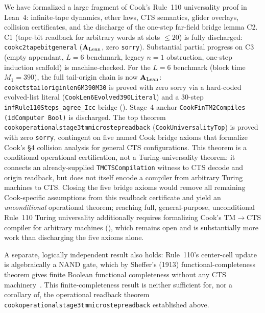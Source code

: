 \documentclass[11pt]{article}
\theoremstyle{remark}
\newcommand{\CatAL}{\ensuremath{\textbf{A}_{\rm Lean}}}
\newcommand{\lean}[1]{%
  \penalty-100
  \begingroup\def\_{\textunderscore\allowbreak}\texttt{#1}\endgroup}
\begin{document}
We have formalized a large fragment of Cook's Rule~110 universality proof in Lean~4:
infinite-tape dynamics, ether laws, CTS semantics, glider overlays, collision certificates,
and the discharge of the one-step far-field bridge lemma C2.
C1 (tape-bit readback for arbitrary words at slots $\le 20$) is fully discharged:
\lean{cook\_c2\_tape\_bit\_general} ($\CatAL$, zero \texttt{sorry}).
Substantial partial progress on C3 (empty appendant, $L{=}6$ benchmark,
legacy $n{=}1$ obstruction, one-step induction scaffold) is machine-checked.
For the $L{=}6$ benchmark (block time $M_1 = 390$), the full tail-origin chain is now
$\CatAL$: \lean{cook\_cts\_tail\_origin\_len6\_M390\_M30} is proved with zero sorry via
a hard-coded evolved-list literal (\texttt{CookLen6Evolved390Literal}) and a 30-step
\texttt{infRule110Steps\_agree\_Icc} bridge ().
Stage~4 anchor \lean{CookFinTM2Compiles (idComputer Bool)} is discharged.
The top theorem \lean{cook\_operational\_stage3\_tm\_microstep\_readback} (\texttt{CookUniversalityTop})
is proved with zero \texttt{sorry}, contingent on five named Cook bridge axioms that
formalize Cook's \S4 collision analysis for general CTS configurations.
This theorem is a conditional operational certification, not a Turing-universality theorem:
it connects an already-supplied \lean{TMCTSCompilation} witness to CTS decode and origin
readback, but does not itself encode a compiler from arbitrary Turing machines to CTS.
Closing the five bridge axioms would remove all remaining Cook-specific assumptions from this
readback certificate and yield an \emph{unconditional} operational theorem; reaching full,
general-purpose, unconditional Rule~110 Turing universality additionally requires formalizing
Cook's TM$\to$CTS compiler for arbitrary machines (), which remains open and is
substantially more work than discharging the five axioms alone.

A separate, logically independent result also holds: Rule~110's center-cell update is
algebraically a NAND gate, which by Sheffer's (1913) functional-completeness theorem gives
finite Boolean functional completeness without any CTS machinery~\cite{SpivackGF7Universality}.
This finite-completeness result is neither sufficient for, nor a corollary of, the
operational readback theorem \lean{cook\_operational\_stage3\_tm\_microstep\_readback} established above.
\end{document}
